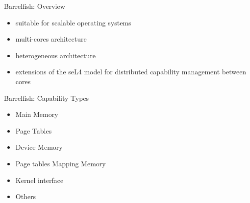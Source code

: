 \documentclass[11pt]{beamer}
\begin{document}
\begin{frame}{Barrelfish: Overview}
	\begin{itemize}

	\item suitable for scalable operating systems 
		\vfill
	\item multi-cores architecture
		\vfill
	\item heterogeneous architecture
		\vfill
	\item extensions of the seL4 model for distributed capability management between cores
	\end{itemize}
\end{frame}


\begin{frame}{Barrelfish: Capability Types}
\begin{itemize}
\item Main Memory
\vfill
\item Page Tables 
\vfill
\item Device Memory
\vfill
\item Page tables Mapping Memory 
\vfill
\item Kernel interface
\vfill
\item Others
\end{itemize}
\end{frame}


		  
\end{document}

